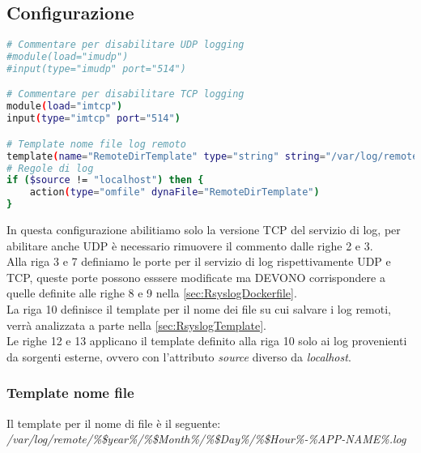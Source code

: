 \documentclass[../DocumentazioneProgetto.tex]{subfiles}
\begin{document}
\subsection{Configurazione} 
\begin{lstlisting}[language=Bash, caption=File di configurazione Rsyslog] 
# Commentare per disabilitare UDP logging
#module(load="imudp")
#input(type="imudp" port="514")

# Commentare per disabilitare TCP logging
module(load="imtcp")
input(type="imtcp" port="514")

# Template nome file log remoto
template(name="RemoteDirTemplate" type="string" string="/var/log/remote/%$year%/%$Month%/%$Day%/%$Hour%-%APP-NAME%.log")
# Regole di log
if ($source != "localhost") then {
	action(type="omfile" dynaFile="RemoteDirTemplate")
}\end{lstlisting}
In questa configurazione abilitiamo solo la versione TCP del servizio di log, per abilitare anche UDP è necessario rimuovere il commento dalle righe 2 e 3.\\
Alla riga 3 e 7 definiamo le porte per il servizio di log rispettivamente UDP e TCP, queste porte possono esssere modificate ma DEVONO corrispondere a quelle definite alle righe 8 e 9 nella \autoref{sec:RsyslogDockerfile}.\\
La riga 10 definisce il template per il nome dei file su cui salvare i log remoti, verrà analizzata a parte nella \autoref{sec:RsyslogTemplate}.\\
Le righe 12 e 13 applicano il template definito alla riga 10 solo ai log provenienti da sorgenti esterne, ovvero con l'attributo \textit{source} diverso da \textit{localhost}.  

\subsubsection{Template nome file} 
\label{sec:RsyslogTemplate}
Il template per il nome di file è il seguente: \\
\textit{/var/log/remote/\%\$year\%/\%\$Month\%/\%\$Day\%/\%\$Hour\%-\%APP-NAME\%.log}
\end{document}
